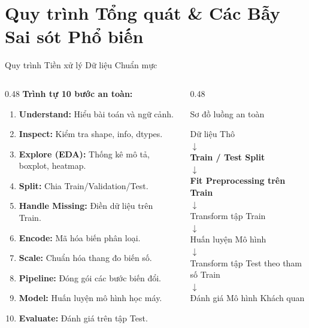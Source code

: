 \documentclass[aspectratio=169,11pt]{beamer}
\begin{document}
\section{Quy trình Tổng quát \& Các Bẫy Sai sót Phổ biến}

\begin{frame}{Quy trình Tiền xử lý Dữ liệu Chuẩn mực}
\begin{columns}[T]
\begin{column}{0.48\textwidth}
\textbf{Trình tự 10 bước an toàn:}
\begin{enumerate}
  \item \textbf{Understand:} Hiểu bài toán và ngữ cảnh.
  \item \textbf{Inspect:} Kiểm tra shape, info, dtypes.
  \item \textbf{Explore (EDA):} Thống kê mô tả, boxplot, heatmap.
  \item \textbf{Split:} Chia Train/Validation/Test.
  \item \textbf{Handle Missing:} Điền dữ liệu trên Train.
  \item \textbf{Encode:} Mã hóa biến phân loại.
  \item \textbf{Scale:} Chuẩn hóa thang đo biến số.
  \item \textbf{Pipeline:} Đóng gói các bước biến đổi.
  \item \textbf{Model:} Huấn luyện mô hình học máy.
  \item \textbf{Evaluate:} Đánh giá trên tập Test.
\end{enumerate}
\end{column}
\begin{column}{0.48\textwidth}
\begin{block}{Sơ đồ luồng an toàn}
\scriptsize
\begin{center}
Dữ liệu Thô \\
$\downarrow$ \\
\textbf{Train / Test Split} \\
$\downarrow$ \\
\textbf{Fit Preprocessing trên Train} \\
$\downarrow$ \\
Transform tập Train \\
$\downarrow$ \\
Huấn luyện Mô hình \\
$\downarrow$ \\
Transform tập Test theo tham số Train \\
$\downarrow$ \\
Đánh giá Mô hình Khách quan
\end{center}
\end{block}
\end{column}
\end{columns}
\end{frame}
\end{document}
